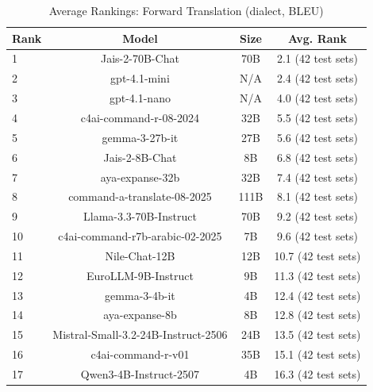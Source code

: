 \begin{table}[htbp]
\centering
\caption{Average Rankings: Forward Translation (dialect, BLEU)}
\label{tab:avg_rankings_bleu_dialect}
\begin{tabular}{l@{\hspace{3pt}}c@{\hspace{3pt}}c@{\hspace{3pt}}c}
\toprule
Rank & Model & Size & Avg. Rank \\
\midrule
1 & Jais-2-70B-Chat & 70B & 2.1 (42 test sets) \\
2 & gpt-4.1-mini & N/A & 2.4 (42 test sets) \\
3 & gpt-4.1-nano & N/A & 4.0 (42 test sets) \\
4 & c4ai-command-r-08-2024 & 32B & 5.5 (42 test sets) \\
5 & gemma-3-27b-it & 27B & 5.6 (42 test sets) \\
6 & Jais-2-8B-Chat & 8B & 6.8 (42 test sets) \\
7 & aya-expanse-32b & 32B & 7.4 (42 test sets) \\
8 & command-a-translate-08-2025 & 111B & 8.1 (42 test sets) \\
9 & Llama-3.3-70B-Instruct & 70B & 9.2 (42 test sets) \\
10 & c4ai-command-r7b-arabic-02-2025 & 7B & 9.6 (42 test sets) \\
11 & Nile-Chat-12B & 12B & 10.7 (42 test sets) \\
12 & EuroLLM-9B-Instruct & 9B & 11.3 (42 test sets) \\
13 & gemma-3-4b-it & 4B & 12.4 (42 test sets) \\
14 & aya-expanse-8b & 8B & 12.8 (42 test sets) \\
15 & Mistral-Small-3.2-24B-Instruct-2506 & 24B & 13.5 (42 test sets) \\
16 & c4ai-command-r-v01 & 35B & 15.1 (42 test sets) \\
17 & Qwen3-4B-Instruct-2507 & 4B & 16.3 (42 test sets) \\
\bottomrule
\end{tabular}
\end{table}